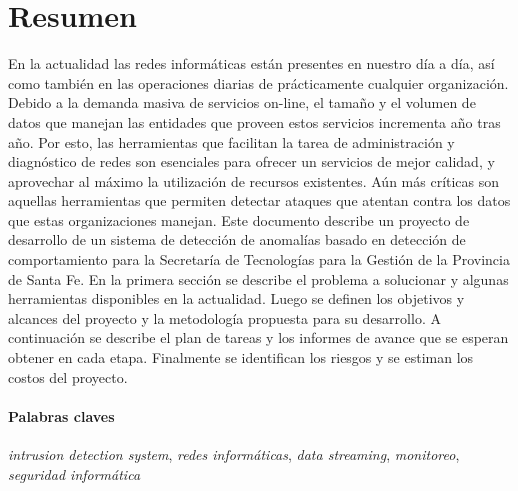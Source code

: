 \section*{Resumen}

En la actualidad las redes informáticas están presentes en nuestro día a día, así como también en las operaciones diarias de prácticamente cualquier organización. Debido a la demanda masiva de servicios on-line, el tamaño y el volumen de datos que manejan las entidades que proveen estos servicios incrementa año tras año. Por esto, las herramientas que facilitan la tarea de administración y diagnóstico de redes son esenciales para ofrecer un servicios de mejor calidad, y aprovechar al máximo la utilización de recursos existentes. Aún más críticas son aquellas herramientas que permiten detectar ataques que atentan contra los datos que estas organizaciones manejan.
Este documento describe un proyecto de desarrollo de un sistema de detección de anomalías basado en detección de comportamiento para la Secretaría de Tecnologías para la Gestión de la Provincia de Santa Fe. En la primera sección se describe el problema a solucionar y algunas herramientas disponibles en la actualidad. Luego se definen los objetivos y alcances del proyecto y la metodología propuesta para su desarrollo. A continuación se describe el plan de tareas y los informes de avance que se esperan obtener en cada etapa. Finalmente se identifican los riesgos y se estiman los costos del proyecto.

\paragraph{Palabras claves} \textit{intrusion detection system}, \textit{redes informáticas}, \textit{data streaming}, \textit{monitoreo}, \textit{seguridad informática}
\newpage